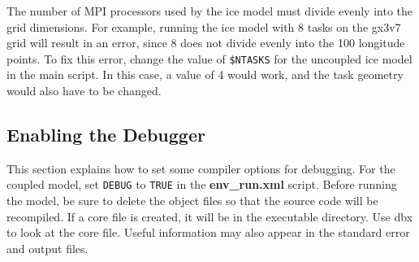 The number of MPI processors used by the ice model must divide evenly into 
the grid dimensions.  For example, running the ice model with 8 tasks on the 
gx3v7 grid will result in an error, since 8 does not divide evenly into the
100 longitude points.  To fix this error, change the value of {\tt \$NTASKS} 
for the uncoupled ice model in the main script.  In this case, a value of 4 
would work, and the task geometry would also have to be changed.

\subsection{Enabling the Debugger}

This section explains how to set some compiler options for debugging. For
the coupled model, set {\tt DEBUG} to {\tt TRUE} in the {\bf env\_run.xml} 
script.  Before running the model, be sure to delete the
object files so that the source code will be recompiled.  If a core file
is created, it will be in the executable directory.  Use dbx to look at
the core file. Useful information may also appear in the standard error
and output files.
